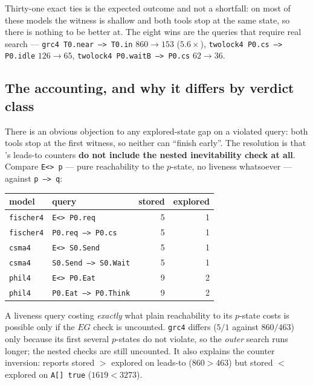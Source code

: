 Thirty-one exact ties is the expected outcome and not a shortfall: on most of these models the
witness is shallow and both tools stop at the same state, so there is nothing to be better at.
The eight wins are the queries that require real search --- \texttt{grc4 T0.near --> T0.in}
$860 \to 153$ ($5.6\times$), \texttt{twolock4 P0.cs --> P0.idle} $126 \to 65$,
\texttt{twolock4 P0.waitB --> P0.cs} $62 \to 36$. \measured{}

\subsection{The accounting, and why it differs by verdict class}
\label{sec:otf:counters}

There is an obvious objection to any explored-state gap on a violated query: both tools stop at the
first witness, so neither can ``finish early''. The resolution is that \verifyta{}'s leads-to
counters \textbf{do not include the nested inevitability check at all}. Compare \texttt{E<> p} ---
pure reachability to the $p$-state, no liveness whatsoever --- against \texttt{p --> q}:

\begin{center}
\begin{tabular}{@{}llrr@{}}
\toprule
model & query & stored & explored \\
\midrule
\texttt{fischer4} & \texttt{E<> P0.req}          & 5 & 1 \\
\texttt{fischer4} & \texttt{P0.req --> P0.cs}    & 5 & 1 \\
\texttt{csma4}    & \texttt{E<> S0.Send}         & 5 & 1 \\
\texttt{csma4}    & \texttt{S0.Send --> S0.Wait} & 5 & 1 \\
\texttt{phil4}    & \texttt{E<> P0.Eat}          & 9 & 2 \\
\texttt{phil4}    & \texttt{P0.Eat --> P0.Think} & 9 & 2 \\
\bottomrule
\end{tabular}
\end{center}

A liveness query costing \emph{exactly} what plain reachability to its $p$-state costs is possible
only if the $EG$ check is uncounted. \texttt{grc4} differs ($5/1$ against $860/463$) only because
its first several $p$-states do not violate, so the \emph{outer} search runs longer; the nested
checks are still uncounted. It also explains the counter inversion: \verifyta{} reports
stored $>$ explored on leads-to ($860 > 463$) but stored $<$ explored on \texttt{A[] true}
($1619 < 3273$). \measured{}

